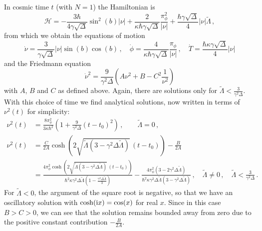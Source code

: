 \documentclass[aps,prd,11pt,showkeys,nofootinbib]{revtex4-2}
\def\im{{\rm i}}
\begin{document}
In cosmic time $t$ (with $N=1$) the Hamiltonian is
\begin{equation}
    \mathcal{H} = -\frac{3\hbar}{4\gamma\sqrt{\Delta}} \sin^2 (b) |\nu|+\frac{2}{\kappa \hbar \gamma\sqrt{\Delta}} \frac{\pi_\phi^2}{|\nu|}+\frac{\hbar\gamma\sqrt{\Delta}}{4} |\nu| \tilde{\Lambda}\,,
    \label{cosmicLQCHamilt}
\end{equation}
from which we obtain the equations of motion
\begin{equation}
\dot\nu = \frac{3}{\gamma\sqrt{\Delta}}|\nu|\sin(b) \cos(b)\,,\quad \dot\phi = \frac{4}{\kappa\hbar\gamma\sqrt{\Delta}}\frac{\pi_\phi}{|\nu|}\,, \quad\dot{T} = \frac{\hbar\kappa\gamma\sqrt{\Delta}}{4} |\nu| 
\label{eq:cosmiceom}
\end{equation}
and the Friedmann equation
\begin{equation}
\dot{\nu}^2 = \frac{9}{\gamma^2\Delta}\left(A\nu^2+B-C^2 \frac{1}{\nu^2}\right)
\label{newproperfried}
\end{equation}
with $A$, $B$ and $C$ as defined above. Again, there are solutions only for $\tilde{\Lambda}<\frac{3}{\gamma^2\Delta}$. With this choice of time we find analytical solutions, now written in terms of $\nu^2(t)$ for simplicity:
\begin{align}
    \nu^2(t) &= \frac{8\pi_\phi^2}{3\kappa\hbar^2}\left(1+\frac{9}{\gamma^2 \Delta}(t-t_0)^2\right)\,, \qquad \tilde{\Lambda}=0\,,\label{eq:vefft L0}\\
    \nu^2(t) &=  \frac{C}{2A}\cosh\left(2\sqrt{\tilde{\Lambda}(3-\gamma^2\Delta\tilde{\Lambda})}\,(t-t_0)\right)-\frac{B}{2 A}\nonumber
    \\ & = \frac{4\pi_\phi^2\cosh\left(2\sqrt{\tilde{\Lambda}(3-\gamma^2\Delta\tilde{\Lambda})}\,(t-t_0)\right)}{\hbar^2\kappa\gamma^2\Delta\tilde\Lambda(1-\frac{\gamma^2\Delta\tilde\Lambda}{3})}-\frac{4\pi_\phi^2(3-2\gamma^2\Delta\tilde\Lambda)}{\hbar^2\kappa\gamma^2\Delta\tilde\Lambda(3-\gamma^2\Delta\tilde\Lambda)}\,,\quad \tilde{\Lambda} \neq 0\,,\quad \tilde{\Lambda}<\frac{3}{\gamma^2\Delta}\,. \label{eq:nu(t) Lambda}
\end{align}
For $\tilde\Lambda<0$, the argument of the square root is negative, so that we have an oscillatory solution with $\cosh(\im x)=\cos(x)$ for real $x$. Since in this case $B>C>0$, we can see that the solution remains bounded away from zero due to the positive constant contribution $-\frac{B}{2A}$.
\end{document}
